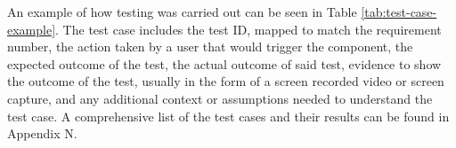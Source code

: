 \documentclass[12pt]{article}
\begin{document}
\begin{table}[H]
\centering
{}
\caption{Example of a test case}
\label{tab:test-case-example}
\end{table}

An example of how testing was carried out can be seen in Table \ref{tab:test-case-example}. The test case includes the test ID, mapped to match the requirement number, the 
action taken by a user that would trigger the component, the expected outcome of the test, the actual outcome of said test, evidence to show the 
outcome of the test, usually in the form of a screen recorded video or screen capture, and any additional context or assumptions needed to understand
the test case. A comprehensive list of the test cases and their results can be found in Appendix N. \newline
\end{document}
